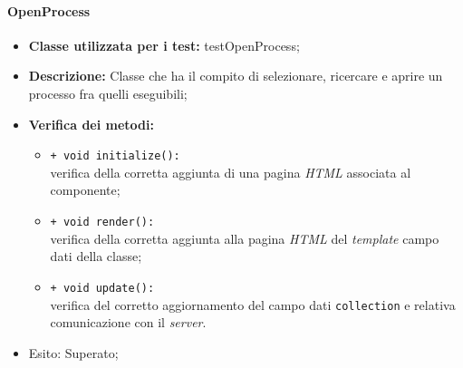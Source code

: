 \paragraph{OpenProcess}
\begin{flushleft}
\begin{itemize}
\item \textbf{Classe utilizzata per i test:} testOpenProcess;
\item \textbf{Descrizione:} Classe che ha il compito di selezionare, ricercare e aprire un processo fra quelli eseguibili;
\item \textbf{Verifica dei metodi:}
\begin{sloppypar}
\begin{itemize}
\item \texttt{+ void initialize():}\\ verifica della corretta aggiunta di una pagina \textit{HTML} associata al componente;
\item \texttt{+ void render():}\\ verifica della corretta aggiunta alla pagina \textit{HTML} del \textit{template} campo dati della classe;
\item \texttt{+ void update():}\\ verifica del corretto aggiornamento del campo dati \texttt{collection} e relativa comunicazione con il \textit{server}.
\end{itemize}
\end{sloppypar}
\item Esito: Superato;
\end{itemize}
\end{flushleft}


